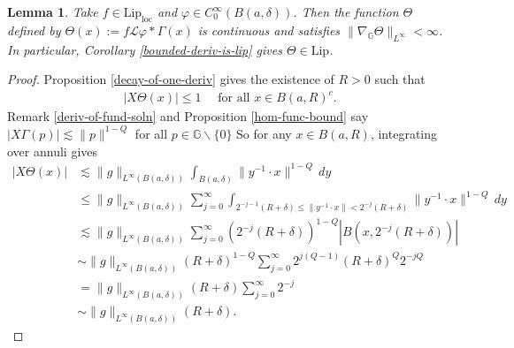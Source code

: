 \documentclass[12pt,a4paper,reqno]{amsart}
\newcommand{\cg}{\Gamma}
\renewcommand{\L}{\mathcal{L}}
\newcommand{\G}{\mathbb{G}}
\numberwithin{equation}{section}
\newtheorem{lem}[thm]{Lemma}
\theoremstyle{definition}
\begin{document}
\begin{lem}\label{third_func_in_lip}
Take $f \in \text{Lip}_{\text{loc}}$ and $\varphi \in C_0^{\infty}(B(a,\delta))$. Then the function $\Theta$ defined by $\Theta (x) := f\L \varphi \ast \cg(x)$ is continuous and satisfies $\| \nabla_{\G} \Theta \|_{L^{\infty}} < \infty$. In particular, Corollary \ref{bounded-deriv-is-lip} gives $\Theta \in \text{Lip}$.  
\end{lem}
\begin{proof}
Proposition \ref{decay-of-one-deriv} gives the existence of $R > 0$ such that \begin{align}
    |X \Theta(x)| \leq 1 \quad \text{ for all }x \in B(a,R)^c. \label{bound_outside_ball}
\end{align} 
Remark \ref{deriv-of-fund-soln} and Proposition \ref{hom-func-bound} say $|X \cg(p)|\lesssim \| p\|^{1-Q}$ for all $p \in \G \backslash \{0\}$
So for any $x \in B(a,R)$, integrating over annuli gives \begin{align*}
    |X \Theta(x)|  &\lesssim \| g\|_{L^{\infty}(B(a,\delta))} \int_{B(a,\delta)} \| y^{-1}\cdot x\|^{1-Q}\,dy  \\ &\leq \|g\|_{L^{\infty}(B(a, \delta))} \sum_{j=0}^{\infty} \int_{ 2^{-j-1}(R+\delta) \leq \| y^{-1} \cdot x\| < 2^{-j}(R+\delta)}\| y^{-1} \cdot x\|^{1-Q}\,dy \\ &\lesssim \| g\|_{L^{\infty}(B(a,\delta))}\sum_{j=0}^{\infty} (2^{-j} (R+\delta))^{1-Q} \left| B(x, 2^{-j}(R+\delta))\right| \\ &\sim \| g\|_{L^{\infty}(B(a,\delta))} (R+\delta)^{1-Q} \sum_{j=0}^{\infty} 2^{j(Q-1)} (R+\delta)^Q 2^{-jQ} \\ &= \| g\|_{L^{\infty}(B(a,\delta))}(R+\delta) \sum_{j=0}^{\infty} 2^{-j} \\ &\sim \| g\|_{L^{\infty}(B(a,\delta))}(R+\delta).

\end{align*}
\end{proof}
\end{document}
